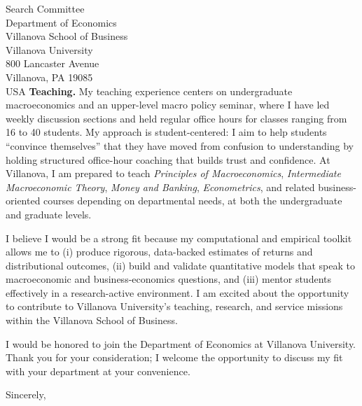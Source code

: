 \documentclass[11pt,letterpaper]{letter}
\begin{document}
\begin{letter}{Search Committee \\
Department of Economics \\
Villanova School of Business \\
Villanova University \\
800 Lancaster Avenue \\
Villanova, PA 19085 \\ USA}
\textbf{Teaching.} My teaching experience centers on undergraduate macroeconomics and an upper-level macro policy seminar, where I have led weekly discussion sections and held regular office hours for classes ranging from 16 to 40 students. My approach is student-centered: I aim to help students “convince themselves” that they have moved from confusion to understanding by holding structured office-hour coaching that builds trust and confidence. At Villanova, I am prepared to teach \textit{Principles of Macroeconomics}, \textit{Intermediate Macroeconomic Theory}, \textit{Money and Banking}, \textit{Econometrics}, and related business-oriented courses depending on departmental needs, at both the undergraduate and graduate levels.

I believe I would be a strong fit because my computational and empirical toolkit allows me to (i) produce rigorous, data-backed estimates of returns and distributional outcomes, (ii) build and validate quantitative models that speak to macroeconomic and business-economics questions, and (iii) mentor students effectively in a research-active environment. I am excited about the opportunity to contribute to Villanova University’s teaching, research, and service missions within the Villanova School of Business.

I would be honored to join the Department of Economics at Villanova University. Thank you for your consideration; I welcome the opportunity to discuss my fit with your department at your convenience.

\closing{Sincerely,}

\end{letter}
\end{document}
